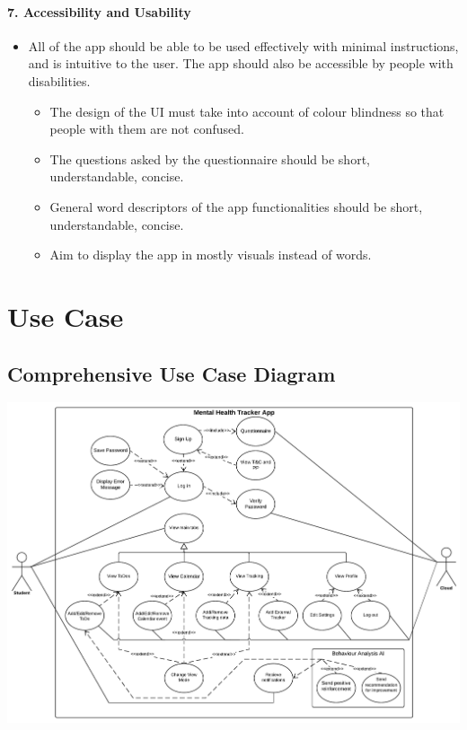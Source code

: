 \documentclass[a4paper,11pt]{article} %
\begin{document}
\hypertarget{accessibility-and-usability}{%
\paragraph{7. Accessibility and
Usability}\label{accessibility-and-usability}}

\begin{itemize}
\item
  All of the app should be able to be used effectively with minimal
  instructions, and is intuitive to the user. The app should also be
  accessible by people with disabilities.

  \begin{itemize}
  \item
    The design of the UI must take into account of colour blindness so
    that people with them are not confused.
  \item
    The questions asked by the questionnaire should be short,
    understandable, concise.
  \item
    General word descriptors of the app functionalities should be short,
    understandable, concise.
  \item
    Aim to display the app in mostly visuals instead of words.
  \end{itemize}
\end{itemize}

\newpage

\section{Use Case}
\subsection{Comprehensive Use Case Diagram}
\begin{center}
\includegraphics[angle=-90, scale=0.7]{img/Usecase_Diagram.pdf}
\end{center}
\end{document}
